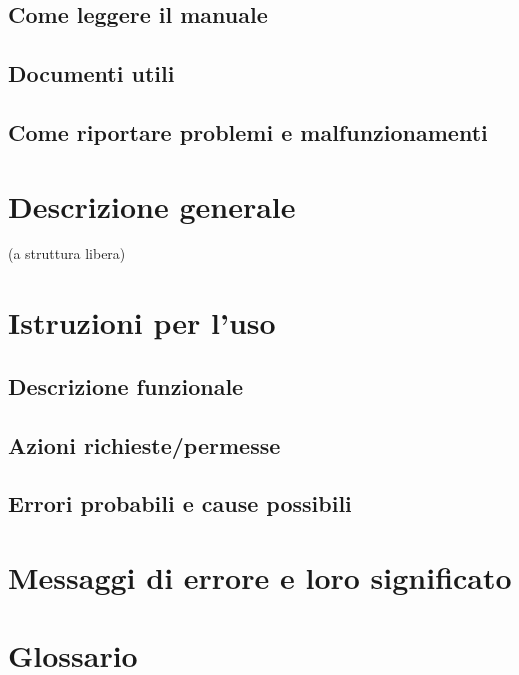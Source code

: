 \section{Come leggere il manuale}

\section{Documenti utili}

\section{Come riportare problemi e malfunzionamenti}


\chapter{Descrizione generale}
\thispagestyle{fancy}
 (a struttura libera)
 
\chapter{Istruzioni per l'uso}
\thispagestyle{fancy}

\section{Descrizione funzionale}

\section{Azioni richieste/permesse}

\section{Errori probabili e cause possibili}


\appendix %
\chapter{Messaggi di errore e loro significato}
\thispagestyle{fancy}

\chapter{Glossario}
\thispagestyle{fancy}



